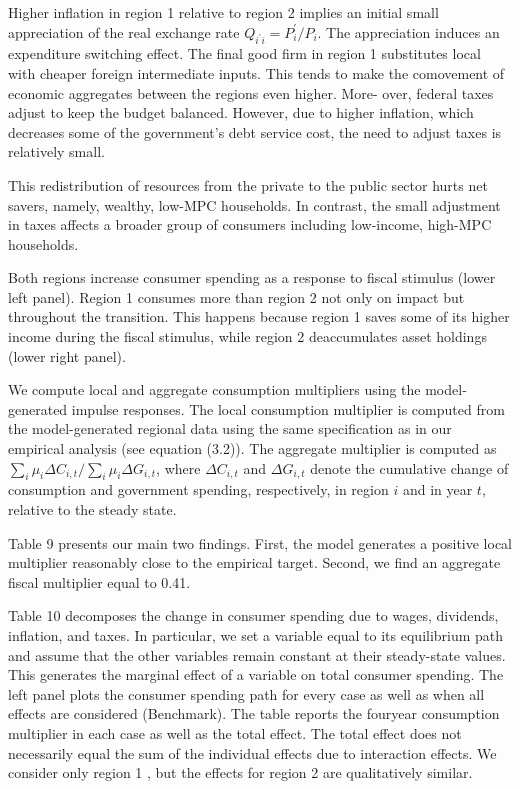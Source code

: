 \documentclass[\latexroot/\projectname]{subfiles}
\begin{document}
Higher inflation in region 1 relative to region 2 implies an initial small appreciation of the real exchange rate $Q_{i^{\prime} i}=P_{i}^{\prime} / P_{i}$. The appreciation induces an expenditure switching effect. The final good firm in region 1 substitutes local with cheaper foreign intermediate inputs. This tends to make the comovement of economic aggregates between the regions even higher. More- over, federal taxes adjust to keep the budget balanced. However, due to higher inflation, which decreases some of the government's debt service cost, the need to adjust taxes is relatively small.



This redistribution of resources from the private to the public sector hurts net savers, namely, wealthy, low-MPC households. In contrast, the small adjustment in taxes affects a broader group of consumers including low-income, high-MPC households.

Both regions increase consumer spending as a response to fiscal stimulus (lower left panel). Region 1 consumes more than region 2 not only on impact but throughout the transition. This happens because region 1 saves some of its higher income during the fiscal stimulus, while region 2 deaccumulates asset holdings (lower right panel).





We compute local and aggregate consumption multipliers using the model-generated impulse responses. The local consumption multiplier is computed from the model-generated regional data using the same specification as in our empirical analysis (see equation (3.2)). The aggregate multiplier is computed as $\sum_{i} \mu_{i} \Delta C_{i, t} / \sum_{i} \mu_{i} \Delta G_{i, t}$, where $\Delta C_{i, t}$ and $\Delta G_{i, t}$ denote the cumulative change of consumption and government spending, respectively, in region $i$ and in year $t$, relative to the steady state.

Table 9 presents our main two findings. First, the model generates a positive local multiplier reasonably close to the empirical target. Second, we find an aggregate fiscal multiplier equal to 0.41.

Table 10 decomposes the change in consumer spending due to wages, dividends, inflation, and taxes. In particular, we set a variable equal to its equilibrium path and assume that the other variables remain constant at their steady-state values. This generates the marginal effect of a variable on total consumer spending. The left panel plots the consumer spending path for every case as well as when all effects are considered (Benchmark). The table reports the fouryear consumption multiplier in each case as well as the total effect. The total effect does not necessarily equal the sum of the individual effects due to interaction effects. We consider only region 1 , but the effects for region 2 are qualitatively similar.
\end{document}
